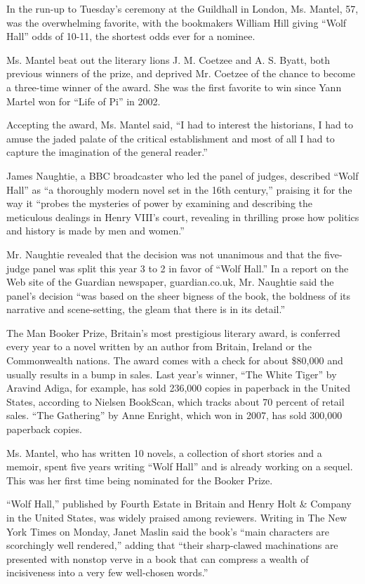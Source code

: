 In the run-up to Tuesday's ceremony at the Guildhall in London, Ms.
Mantel, 57, was the overwhelming favorite, with the bookmakers William
Hill giving ``Wolf Hall'' odds of 10-11, the shortest odds ever for a
nominee.

Ms. Mantel beat out the literary lions J. M. Coetzee and A. S. Byatt,
both previous winners of the prize, and deprived Mr. Coetzee of the
chance to become a three-time winner of the award. She was the first
favorite to win since Yann Martel won for ``Life of Pi'' in 2002.

Accepting the award, Ms. Mantel said, ``I had to interest the
historians, I had to amuse the jaded palate of the critical
establishment and most of all I had to capture the imagination of the
general reader.''

James Naughtie, a BBC broadcaster who led the panel of judges, described
``Wolf Hall'' as ``a thoroughly modern novel set in the 16th century,''
praising it for the way it ``probes the mysteries of power by examining
and describing the meticulous dealings in Henry VIII's court, revealing
in thrilling prose how politics and history is made by men and women.''

Mr. Naughtie revealed that the decision was not unanimous and that the
five-judge panel was split this year 3 to 2 in favor of ``Wolf Hall.''
In a report on the Web site of the Guardian newspaper, guardian.co.uk,
Mr. Naughtie said the panel's decision ``was based on the sheer bigness
of the book, the boldness of its narrative and scene-setting, the gleam
that there is in its detail.''

The Man Booker Prize, Britain's most prestigious literary award, is
conferred every year to a novel written by an author from Britain,
Ireland or the Commonwealth nations. The award comes with a check for
about \$80,000 and usually results in a bump in sales. Last year's
winner, ``The White Tiger'' by Aravind Adiga, for example, has sold
236,000 copies in paperback in the United States, according to Nielsen
BookScan, which tracks about 70 percent of retail sales. ``The
Gathering'' by Anne Enright, which won in 2007, has sold 300,000
paperback copies.

Ms. Mantel, who has written 10 novels, a collection of short stories and
a memoir, spent five years writing ``Wolf Hall'' and is already working
on a sequel. This was her first time being nominated for the Booker
Prize.

``Wolf Hall,'' published by Fourth Estate in Britain and Henry Holt \&
Company in the United States, was widely praised among reviewers.
Writing in The New York Times on Monday, Janet Maslin said the book's
``main characters are scorchingly well rendered,'' adding that ``their
sharp-clawed machinations are presented with nonstop verve in a book
that can compress a wealth of incisiveness into a very few well-chosen
words.''

